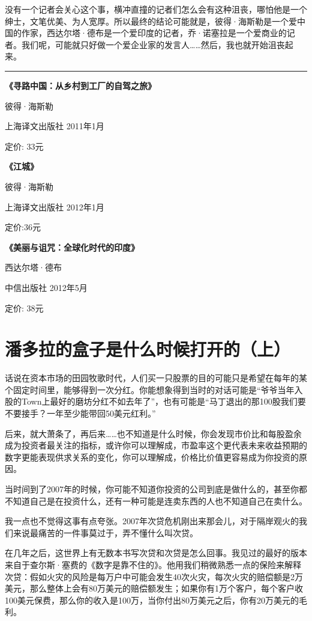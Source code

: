 没有一个记者会关心这个事，横冲直撞的记者们怎么会有这种沮丧，哪怕他是一个绅士，文笔优美、为人宽厚。所以最终的结论可能就是，彼得·海斯勒是一个爱中国的作家，西达尔塔·德布是一个爱印度的记者，乔·诺塞拉是一个爱商业的记者。我们呢，可能就只好做一个爱企业家的发言人\ldots{}\ldots{}然后，我也就开始沮丧起来。

\begin{center}\rule{3in}{0.4pt}\end{center}

\textbf{《寻路中国：从乡村到工厂的自驾之旅》}

彼得·海斯勒

上海译文出版社 2011年1月

定价: 33元

\textbf{《江城》}

彼得·海斯勒

上海译文出版社 2012年1月

定价:36元

\textbf{《美丽与诅咒：全球化时代的印度》}

西达尔塔·德布

中信出版社 2012年5月

定价: 38元

\section{潘多拉的盒子是什么时候打开的（上）}

话说在资本市场的田园牧歌时代，人们买一只股票的目的可能只是希望在每年的某个固定时间里，能够得到一次分红。你能想象得到当时的对话可能是``爷爷当年入股的Town上最好的磨坊分红不如去年了''，也有可能是``马丁退出的那100股我们要不要接手？一年至少能带回50美元红利。''

后来，就大萧条了，再后来\ldots{}\ldots{}也不知道是什么时候，你会发现市价比和每股盈余成为投资者最关注的指标，或许你可以理解成，市盈率这个更代表未来收益预期的数字更能表现供求关系的变化，你可以理解成，价格比价值更容易成为你投资的原因。

当时间到了2007年的时候，你可能不知道你投资的公司到底是做什么的，甚至你都不知道自己是在投资什么，还有一种可能是连卖东西的人也不知道自己在卖什么。

我一点也不觉得这事有点夸张。2007年次贷危机刚出来那会儿，对于隔岸观火的我们来说最痛苦的一件事莫过于，弄不懂什么叫次贷。

在几年之后，这世界上有无数本书写次贷和次贷是怎么回事。我见过的最好的版本来自于查尔斯·塞费的《数字是靠不住的》。他用我们稍微熟悉一点的保险来解释次贷：假如火灾的风险是每万户中可能会发生40次火灾，每次火灾的赔偿额是2万美元，那么整体上会有80万美元的赔偿额发生；如果你有1万个客户，每个客户收100美元保费，那么你的收入是100万，当你付出80万美元之后，你有20万美元的毛利。

